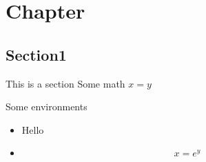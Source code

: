 \documentclass{article}
\begin{document}
\chapter{Chapter}

\section{Section1}
This is a section
Some math
$x=y$

Some environments
\begin{itemize}
\item Hello
\item \begin{equation}
        x= e^{y}
    \end{equation}
\end{itemize}
\end{document}
